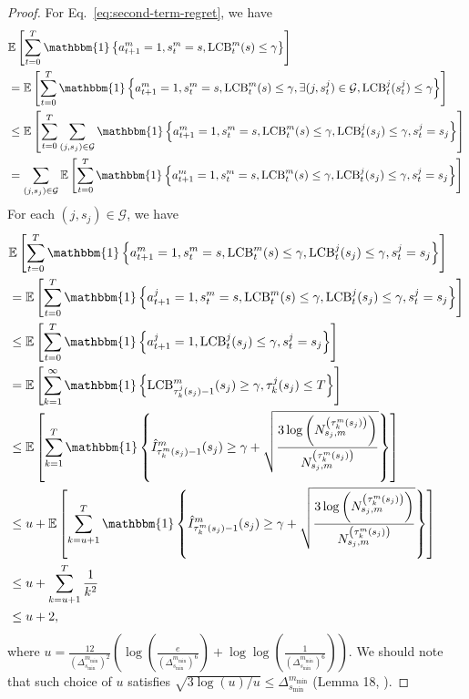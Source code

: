 \begin{proof}
For Eq.~\eqref{eq:second-term-regret}, we have
\begin{align*}
    &\E\left[\sum_{t=0}^T \mathbbm{1}\left\{a_{t+1}^m=1,s_t^m=s,\mathrm{LCB}_{t}^m(s)\leq \gamma\right\}\right]\\&=\E\left[\sum_{t=0}^T \mathbbm{1}\left\{a_{t+1}^m=1,s_t^m=s,\mathrm{LCB}_{t}^m(s)\leq\gamma,\exists(j,s_t^j)\in\mathcal{G},\mathrm{LCB}_{t}^j(s_t^j)\leq \gamma\right\}\right]\\
    &\leq \E\left[\sum_{t=0}^T\sum_{(j,s_j)\in\mathcal{G}}\mathbbm{1}\left\{a_{t+1}^m=1,s_t^m=s,\mathrm{LCB}_{t}^m(s)\leq\gamma,\mathrm{LCB}_{t}^j(s_j)\leq \gamma,s_t^j=s_j\right\}\right]\\
    &=\sum_{(j,s_j)\in\mathcal{G}}\E\left[\sum_{t=0}^T\mathbbm{1}\left\{a_{t+1}^m=1,s_t^m=s,\mathrm{LCB}_{t}^m(s)\leq\gamma,\mathrm{LCB}_{t}^j(s_j)\leq \gamma,s_t^j=s_j\right\}\right]
\end{align*}
For each $(j,s_j)\in\mathcal{G}$, we have
\begin{align*}
    &\E\left[\sum_{t=0}^T\mathbbm{1}\left\{a_{t+1}^m=1,s_t^m=s,\mathrm{LCB}_{t}^m(s)\leq\gamma,\mathrm{LCB}_{t}^j(s_j)\leq \gamma,s_t^j=s_j\right\}\right]\\
    &=\E\left[\sum_{t=0}^T\mathbbm{1}\left\{a_{t+1}^j=1,s_t^m=s,\mathrm{LCB}_{t}^m(s)\leq\gamma,\mathrm{LCB}_{t}^j(s_j)\leq \gamma,s_t^j=s_j\right\}\right]\\
    &\leq \E\left[\sum_{t=0}^T\mathbbm{1}\left\{a_{t+1}^j=1,\mathrm{LCB}_{t}^j(s_j)\leq \gamma,s_t^j=s_j\right\}\right]\\
    &=\E\left[\sum_{k=1}^\infty \mathbbm{1}\left\{\mathrm{LCB}_{\tau_k^j(s_j)-1}^m(s_j)\geq\gamma,\tau_k^j(s_j)\leq T\right\}\right]\\
    &\leq \E\left[\sum_{k=1}^T \mathbbm{1}\left\{\hat{I}_{\tau_k^m(s_j)-1}^m(s_j)\geq\gamma+\sqrt{\frac{3\log\left(N_{s_j,m}^{\left(\tau_k^m(s_j)\right)}\right)}{N_{s_j,m}^{\left(\tau_k^m(s_j)\right)}}}\right\}\right]\\
    &\leq u+\E\left[\sum_{k=u+1}^T \mathbbm{1}\left\{\hat{I}_{\tau_k^m(s_j)-1}^m(s_j)\geq\gamma+\sqrt{\frac{3\log\left(N_{s_j,m}^{\left(\tau_k^m(s_j)\right)}\right)}{N_{s_j,m}^{\left(\tau_k^m(s_j)\right)}}}\right\}\right]\\
    &\leq u+\sum_{k=u+1}^T\frac{1}{k^2}\\
    &\leq u+2,
\end{align*}
where $u=\frac{12}{\left(\Delta_{s_{\min}}^{m_{\min}}\right)^2}\left(\log\left(\frac{e}{\left(\Delta_{s_{\min}}^{m_{\min}}\right)^6}\right)+\log\log\left(\frac{1}{\left(\Delta_{s_{\min}}^{m_{\min}}\right)^6}\right)\right)$. We should note that such choice of $u$ satisfies $\sqrt{3\log(u)/u}\leq \Delta_{s_{\min}}^{m_{\min}}$ (Lemma 18, \citet{garivier2016optimal}).

\end{proof}
